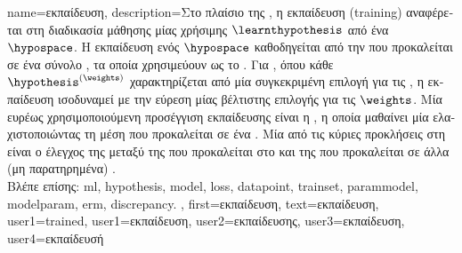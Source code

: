 {name={\foreignlanguage{greek}{εκπαίδευση}}, 
	description={\foreignlanguage{greek}{Στο πλαίσιο της} , \foreignlanguage{greek}{η εκπαίδευση} 
		(training) \foreignlanguage{greek}{αναφέρεται στη διαδικασία μάθησης μίας χρήσιμης}
		 $\learnthypothesis$ \foreignlanguage{greek}{από ένα}  $\hypospace$. 
		\foreignlanguage{greek}{Η εκπαίδευση ενός}  $\hypospace$ \foreignlanguage{greek}{καθοδηγείται από την}
		 \foreignlanguage{greek}{που προκαλείται σε ένα σύνολο} , \foreignlanguage{greek}{τα οποία  
		χρησιμεύουν ως το} . \foreignlanguage{greek}{Για} , \foreignlanguage{greek}{όπου κάθε}
		 $\hypothesis^{(\weights)}$ \foreignlanguage{greek}{χαρακτηρίζεται από μία συγκεκριμένη επιλογή για τις} 
		, \foreignlanguage{greek}{η εκπαίδευση ισοδυναμεί με την εύρεση μίας βέλτιστης επιλογής για τις} 
		 $\weights$. \foreignlanguage{greek}{Μία ευρέως χρησιμοποιούμενη προσέγγιση εκπαίδευσης είναι η} 
		, \foreignlanguage{greek}{η οποία μαθαίνει μία}  \foreignlanguage{greek}{ελαχιστοποιώντας 
		τη μέση}  \foreignlanguage{greek}{που προκαλείται σε ένα} . 
		\foreignlanguage{greek}{Μία από τις κύριες προκλήσεις στη}  \foreignlanguage{greek}{είναι ο έλεγχος της} 
		 \foreignlanguage{greek}{μεταξύ της}  \foreignlanguage{greek}{που προκαλείται στο}  
		 \foreignlanguage{greek}{και της}  \foreignlanguage{greek}{που προκαλείται σε άλλα (μη παρατηρημένα)}
		.
				\\
		\foreignlanguage{greek}{Βλέπε επίσης:} \gls{ml}, \gls{hypothesis}, \gls{model}, \gls{loss}, \gls{datapoint}, \gls{trainset}, \gls{parammodel}, 
		\gls{modelparam}, \gls{erm}, \gls{discrepancy}. },
	first={\foreignlanguage{greek}{εκπαίδευση}},
	text={\foreignlanguage{greek}{εκπαίδευση}}, 
	user1={trained},
	user1={\foreignlanguage{greek}{εκπαίδευση}}, %
	user2={\foreignlanguage{greek}{εκπαίδευσης}}, %
	user3={\foreignlanguage{greek}{εκπαίδευση}}, %
	user4={\foreignlanguage{greek}{εκπαίδευσή}} %
}

